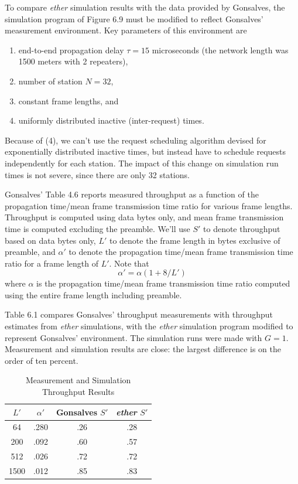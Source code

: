To compare \emph{ether} simulation results with the data provided by Gonsalves, the simulation program of Figure 6.9 must be modified to reflect Gonsalves' measurement environment. Key parameters of this environment are
\begin{enumerate}
\item end-to-end propagation delay $\tau=15$ microseconds (the network length was 1500 meters with 2 repeaters),
\item number of station $N=32$,
\item constant frame lengths, and
\item uniformly distributed inactive (inter-request) times.
\end{enumerate}
Because of (4), we can't use the request scheduling algorithm devised for exponentially distributed inactive times, but instead have to schedule requests independently for each station. The impact of this change on simulation run times is not severe, since there are only 32 stations.

Gonsalves' Table 4.6 reports measured throughput as a function of the propagation time/mean frame transmission time ratio for various frame lengths. Throughput is computed using data bytes only, and mean frame transmission time is computed excluding the preamble. We'll use $S'$ to denote throughput based on data bytes only, $L'$ to denote the frame length in bytes exclusive of preamble, and $\alpha'$ to denote the propagation time/mean frame transmission time ratio for a frame length of $L'$. Note that
\begin{equation} \alpha'=\alpha(1+8/L') \end{equation}
where $\alpha$ is the propagation time/mean frame transmission time ratio computed using the entire frame length including preamble.

Table 6.1 compares Gonsalves' throughput measurements with throughput estimates from \emph{ether} simulations, with the \emph{ether} simulation program modified to represent Gonsalves' environment. The simulation runs were made with $G=1$. Measurement and simulation results are close: the largest difference is on the order of ten percent.

\begin{table}[htbp]
\centering
\begin{tabular}{cccc}
$L'$ & $\alpha'$ & Gonsalves $S'$ & \emph{ether} $S'$ \\
\hline
64 & .280 & .26 & .28 \\
200 & .092 & .60 & .57 \\
512 & .026 & .72 & .72 \\
1500 & .012 & .85 & .83 \\
\end{tabular}
\caption{Measurement and Simulation Throughput Results}
\end{table}

